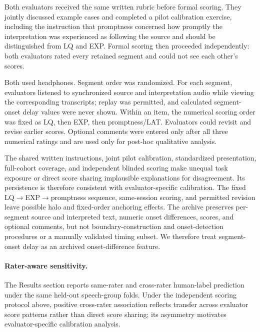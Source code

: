 Both evaluators received the same written rubric before formal scoring. They jointly discussed example cases and completed a pilot calibration exercise, including the instruction that promptness concerned how promptly the interpretation was experienced as following the source and should be distinguished from LQ and EXP. Formal scoring then proceeded independently: both evaluators rated every retained segment and could not see each other's scores.

Both used headphones. Segment order was randomized. For each segment, evaluators listened to synchronized source and interpretation audio while viewing the corresponding transcripts; replay was permitted, and calculated segment-onset delay values were never shown. Within an item, the numerical scoring order was fixed as LQ, then EXP, then promptness/LAT. Evaluators could revisit and revise earlier scores. Optional comments were entered only after all three numerical ratings and are used only for post-hoc qualitative analysis.

The shared written instructions, joint pilot calibration, standardized presentation, full-cohort coverage, and independent blinded scoring make unequal task exposure or direct score sharing implausible explanations for disagreement. Its persistence is therefore consistent with evaluator-specific calibration. The fixed LQ$\rightarrow$EXP$\rightarrow$promptness sequence, same-session scoring, and permitted revision leave possible halo and fixed-order anchoring effects. The archive preserves per-segment source and interpreted text, numeric onset differences, scores, and optional comments, but not boundary-construction and onset-detection procedures or a manually validated timing subset. We therefore treat segment-onset delay as an archived onset-difference feature.

\paragraph{Rater-aware sensitivity.} The Results section reports same-rater and cross-rater human-label prediction under the same held-out speech-group folds. Under the independent scoring protocol above, positive cross-rater association reflects transfer across evaluator score patterns rather than direct score sharing; its asymmetry motivates evaluator-specific calibration analysis.
